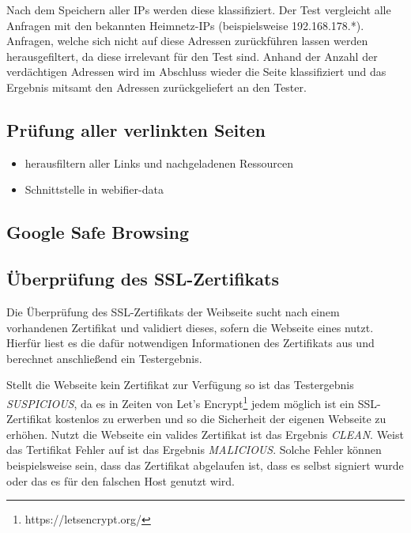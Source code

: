 Nach dem Speichern aller IPs werden diese klassifiziert. Der Test vergleicht alle Anfragen mit den bekannten Heimnetz-IPs (beispielsweise 192.168.178.*). Anfragen, welche sich nicht auf diese Adressen zurückführen lassen werden herausgefiltert, da diese irrelevant für den Test sind. Anhand der Anzahl der verdächtigen Adressen wird im Abschluss wieder die Seite klassifiziert und das Ergebnis mitsamt den Adressen zurückgeliefert an den Tester.

\subsection{Prüfung aller verlinkten Seiten}
\label{sec:konzept-linkchecker}


\begin{itemize}
  \item herausfiltern aller Links und nachgeladenen Ressourcen
  \item Schnittstelle in webifier-data
\end{itemize}

\subsection{Google Safe Browsing}


\subsection{Überprüfung des SSL-Zertifikats}

Die Überprüfung des SSL-Zertifikats der Weibseite sucht nach einem vorhandenen Zertifikat und validiert dieses, sofern die Webseite eines nutzt. Hierfür liest es die dafür notwendigen Informationen des  Zertifikats aus und berechnet anschließend ein Testergebnis.

Stellt die Webseite kein Zertifikat zur Verfügung so ist das Testergebnis \textit{SUSPICIOUS}, da es in Zeiten von Let's Encrypt\footnote{https://letsencrypt.org/} jedem möglich ist ein SSL-Zertifikat kostenlos zu erwerben und so die Sicherheit der eigenen Webseite zu erhöhen. Nutzt die Webseite ein valides Zertifikat ist das Ergebnis \textit{CLEAN}. Weist das Tertifikat Fehler auf ist das Ergebnis \textit{MALICIOUS}. Solche Fehler können beispielsweise sein, dass das Zertifikat abgelaufen ist, dass es selbst signiert wurde oder das es für den falschen Host genutzt wird.

